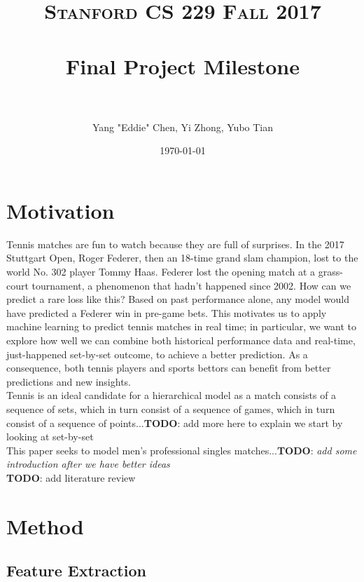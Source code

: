 \documentclass[paper=a4, fontsize=11pt]{scrartcl} %
\title{	
\normalfont \normalsize 
\textsc{Stanford CS 229 Fall 2017} \\ [25pt] %
\horrule{0.5pt} \\[0.4cm] %
\huge Final Project Milestone\\ %
\horrule{2pt} \\[0.5cm] %
}
\author{Yang "Eddie" Chen, Yi Zhong, Yubo Tian} %
\date{\normalsize\today} %
\numberwithin{equation}{section} %
\numberwithin{figure}{section} %
\numberwithin{table}{section} %
\begin{document}
\maketitle %


\section{Motivation}
Tennis matches are fun to watch because they are full of surprises. In the 2017 Stuttgart Open, Roger Federer, then an 18-time grand slam champion, lost to the world No. 302 player Tommy Haas. Federer lost the opening match at a grass-court tournament, a phenomenon that hadn't happened since 2002. How can we predict a rare loss like this? Based on past performance alone, any model would have predicted a Federer win in pre-game bets. This motivates us to apply machine learning to predict tennis matches in real time; in particular, we want to explore how well we can combine both historical performance data and real-time, just-happened set-by-set outcome, to achieve a better prediction. As a consequence, both tennis players and sports bettors can benefit from better predictions and new insights. \\

Tennis is an ideal candidate for a hierarchical model as a match consists of a sequence of sets, which in turn consist of a sequence of games, which in turn consist of a sequence of points...\textbf{TODO}: add more here to explain we start by looking at set-by-set \cite{tennis1}\\

This paper seeks to model men's professional singles matches...\textbf{TODO}: \textit{add some introduction after we have better ideas} \\

\textbf{TODO}: add literature review

\section{Method}
\subsection{Feature Extraction}
\end{document}
